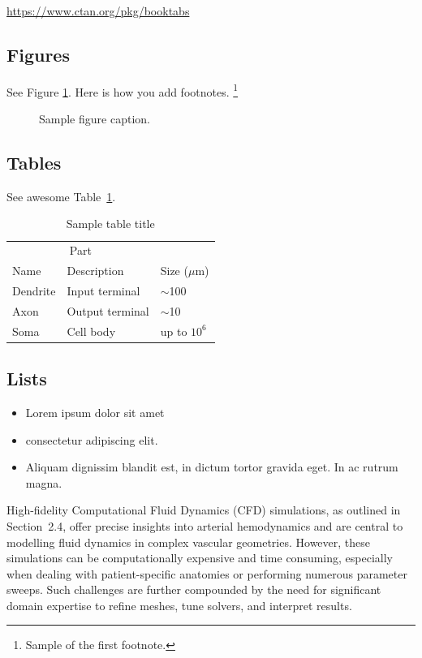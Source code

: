 \documentclass{article}
\begin{document}
\begin{center}
  \url{https://www.ctan.org/pkg/booktabs}
\end{center}


\subsection{Figures}
\lipsum[10] 
See Figure \ref{fig:fig1}. Here is how you add footnotes. \footnote{Sample of the first footnote.}
\lipsum[11] 

\begin{figure}
  \centering
  \fbox{\rule[-.5cm]{4cm}{4cm} \rule[-.5cm]{4cm}{0cm}}
  \caption{Sample figure caption.}
  \label{fig:fig1}
\end{figure}

\subsection{Tables}
\lipsum[12]
See awesome Table~\ref{tab:table}.

\begin{table}
 \caption{Sample table title}
  \centering
  \begin{tabular}{lll}
    \toprule
    \multicolumn{2}{c}{Part}                   \\
    \cmidrule(r){1-2}
    Name     & Description     & Size ($\mu$m) \\
    \midrule
    Dendrite & Input terminal  & $\sim$100     \\
    Axon     & Output terminal & $\sim$10      \\
    Soma     & Cell body       & up to $10^6$  \\
    \bottomrule
  \end{tabular}
  \label{tab:table}
\end{table}

\subsection{Lists}
\begin{itemize}
\item Lorem ipsum dolor sit amet
\item consectetur adipiscing elit. 
\item Aliquam dignissim blandit est, in dictum tortor gravida eget. In ac rutrum magna.
\end{itemize}


High-fidelity Computational Fluid Dynamics (CFD) simulations, as outlined in Section~2.4, offer precise insights into arterial hemodynamics and are central to modelling fluid dynamics in complex vascular geometries. However, these simulations can be computationally expensive and time consuming, especially when dealing with patient-specific anatomies or performing numerous parameter sweeps. Such challenges are further compounded by the need for significant domain expertise to refine meshes, tune solvers, and interpret results.
\end{document}
